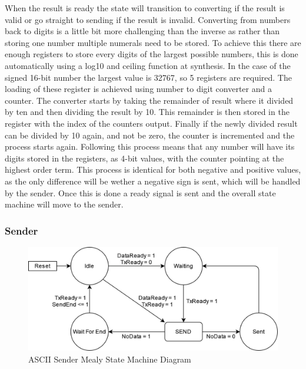 \documentclass[11pt]{article}
\begin{document}
When the result is ready the state will transition to converting if the result is valid or go straight to sending if the result is invalid.
Converting from numbers back to digits is a little bit more challenging than the inverse as rather than storing one number multiple numerals need to be stored.
To achieve this there are enough registers to store every digits of the largest possible numbers,
this is done automatically using a log10 and ceiling function at synthesis.
In the case of the signed 16-bit number the largest value is 32767, so 5 registers are required.
The loading of these register is achieved using number to digit converter and a counter.
The converter starts by taking the remainder of result where it divided by ten and then dividing the result by 10.
This remainder is then stored in the register with the index of the counters output. 
Finally if the newly divided result can be divided by 10 again, and not be zero, the counter is incremented and the process starts again.
Following this process means that any number will have its digits stored in the registers, as 4-bit values, with the counter pointing at the highest order term.
This process is identical for both negative and positive values, as the only difference will be wether a negative sign is sent, which will be handled by the sender.
Once this is done a ready signal is sent and the overall state machine will move to the sender.

\subsubsection{Sender}
\begin{figure}[H]        
    \centering
    \includegraphics[width=.66\textwidth]{SenderSM.drawio.png}
    \caption{ASCII Sender Mealy State Machine Diagram}
    \label{fig:sendersm}
\end{figure} 
\end{document}
